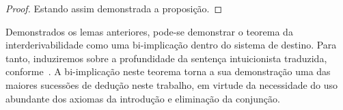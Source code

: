 \begin{tcolorbox}[enhanced jigsaw, breakable, sharp corners, colframe=black, colback=white, boxrule=0.5pt, left=1.5mm, right=1.5mm, top=1.5mm, bottom=1.5mm]
\begin{lemma}
\begin{proof}
        \vspace{0.5\baselineskip}
        Estando assim demonstrada a proposição.
        \end{proof}
    \end{lemma}
\end{tcolorbox}

\vspace{.5\baselineskip}
Demonstrados os lemas anteriores, pode-se demonstrar o teorema da interderivabilidade como uma bi-implicação dentro do sistema de destino.
Para tanto, induziremos sobre a profundidade da sentença intuicionista traduzida, conforme~\cite{Troelstra+Schwichtenberg.2000}.
A bi-implicação neste teorema torna a sua demonstração uma das maiores sucessões de dedução neste trabalho, em virtude da necessidade do uso abundante dos axiomas da introdução e eliminação da conjunção.

